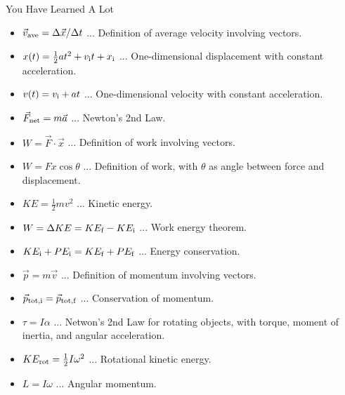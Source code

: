 \documentclass{beamer}
\begin{document}
\begin{frame}{You Have Learned A Lot}
\scriptsize
\begin{itemize}
\item $\vec{v}_{\rm ave} = \Delta\vec{x}/\Delta t$ ... Definition of average velocity involving vectors.
\item $x(t) = \frac{1}{2}at^2 + v_{\rm i} t + x_{\rm i}$ ... One-dimensional displacement with constant acceleration.
\item $v(t) = v_{\rm i} + a t$ ... One-dimensional velocity with constant acceleration. 
\item $\vec{F}_{\rm net} = m\vec{a}$ ... Newton's 2nd Law.
\item $W = \vec{F} \cdot \vec{x}$ ... Definition of work involving vectors.
\item $W = Fx\cos\theta$ ... Definition of work, with $\theta$ as angle between force and displacement.
\item $KE = \frac{1}{2} m v^2$ ... Kinetic energy.
\item $W = \Delta KE = KE_{\rm f} - KE_{\rm i}$ ... Work energy theorem.
\item $KE_{\rm i} + PE_{\rm i} = KE_{\rm f} + PE_{\rm f}$ ... Energy conservation.
\item $\vec{p} = m\vec{v}$ ... Definition of momentum involving vectors.
\item $\vec{p}_{\rm tot,i} = \vec{p}_{\rm tot,f}$ ... Conservation of momentum.
\item $\tau = I\alpha$ ... Netwon's 2nd Law for rotating objects, with torque, moment of inertia, and angular acceleration.
\item $KE_{\rm rot} = \frac{1}{2}I \omega^2$ ... Rotational kinetic energy.
\item $L = I \omega$ ... Angular momentum.
\end{itemize}
\end{frame}
\end{document}

